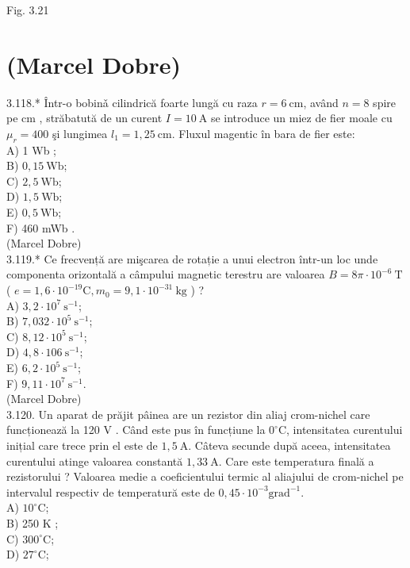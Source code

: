 \documentclass[10pt]{article}
\begin{document}
Fig. 3.21

\section*{(Marcel Dobre)}
3.118.* Într-o bobinǎ cilindrică foarte lungă cu raza $r=6 \mathrm{~cm}$, având $n=8$ spire pe cm , străbatută de un curent $I=10 \mathrm{~A}$ se introduce un miez de fier moale cu $\mu_{r}=400$ şi lungimea $l_{1}=1,25 \mathrm{~cm}$. Fluxul magentic în bara de fier este:\\
A) 1 Wb ;\\
B) $0,15 \mathrm{~Wb}$;\\
C) $2,5 \mathrm{~Wb}$;\\
D) $1,5 \mathrm{~Wb}$;\\
E) $0,5 \mathrm{~Wb}$;\\
F) 460 mWb .\\
(Marcel Dobre)\\
3.119.* Ce frecvență are mişcarea de rotație a unui electron într-un loc unde componenta orizontală a câmpului magnetic terestru are valoarea $B=8 \pi \cdot 10^{-6} \mathrm{~T}$ ( $e=1,6 \cdot 10^{-19} \mathrm{C}, m_{0}=9,1 \cdot 10^{-31} \mathrm{~kg}$ ) ?\\
A) $3,2 \cdot 10^{7} \mathrm{~s}^{-1}$;\\
B) $7,032 \cdot 10^{5} \mathrm{~s}^{-1}$;\\
C) $8,12 \cdot 10^{5} \mathrm{~s}^{-1}$;\\
D) $4,8 \cdot 106 \mathrm{~s}^{-1}$;\\
E) $6,2 \cdot 10^{5} \mathrm{~s}^{-1}$;\\
F) $9,11 \cdot 10^{7} \mathrm{~s}^{-1}$.\\
(Marcel Dobre)\\
3.120. Un aparat de prăjit pâinea are un rezistor din aliaj crom-nichel care funcționează la 120 V . Când este pus în funcțiune la $0^{\circ} \mathrm{C}$, intensitatea curentului inițial care trece prin el este de $1,5 \mathrm{~A}$. Câteva secunde după aceea, intensitatea curentului atinge valoarea constantă $1,33 \mathrm{~A}$. Care este temperatura finală a rezistorului ? Valoarea medie a coeficientului termic al aliajului de crom-nichel pe intervalul respectiv de temperatură este de $0,45 \cdot 10^{-3} \mathrm{grad}^{-1}$.\\
A) $10^{\circ} \mathrm{C}$;\\
B) 250 K ;\\
C) $300^{\circ} \mathrm{C}$;\\
D) $27^{\circ} \mathrm{C}$;\\
\end{document}
